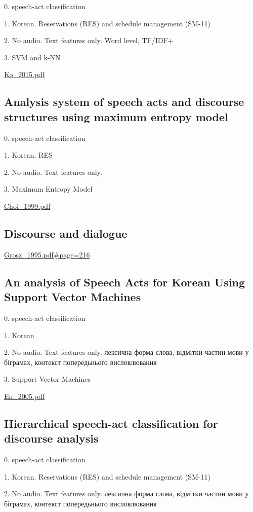 0. speech-act classification

1. Korean. Reservations (RES) and schedule management (SM-11)

2. No audio. Text features only. Word level, TF/IDF+

3. SVM and k-NN

\url{Ko_2015.pdf}\cite{Ko_2015}

\subsection{Analysis system of speech acts and discourse structures using maximum entropy model}

0. speech-act classification

1. Korean. RES

2. No audio. Text features only. 

3. Maximum Entropy Model

\url{Choi_1999.pdf}\cite{Choi_1999}

\subsection{Discourse and dialogue}

\url{Grosz_1995.pdf#page=216}\cite{Grosz_1995}

\subsection{An analysis of Speech Acts for Korean Using Support Vector Machines}

0. speech-act classification

1. Korean

2. No audio. Text features only. лексична форма слова, відмітки частин мови у біграмах, контекст попередьнього висловлювання

3. Support Vector Machines

\url{En_2005.pdf}\cite{En_2005}

\subsection{Hierarchical speech-act classification for discourse analysis}

0. speech-act classification

1. Korean. Reservations (RES) and schedule management (SM-11)

2. No audio. Text features only. лексична форма слова, відмітки частин мови у біграмах, контекст попередьнього висловлювання

